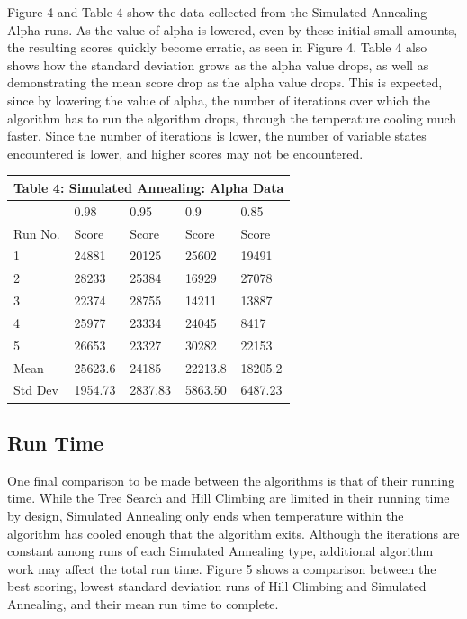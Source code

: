 \documentclass[10pt, twocolumn]{article}
\begin{document}
Figure 4 and Table 4 show the data collected from the Simulated Annealing Alpha runs. As the
value of alpha is lowered, even by these initial small amounts, the resulting scores
quickly become erratic, as seen in Figure 4. Table 4 also shows how the standard deviation
grows as the alpha value drops, as well as demonstrating the mean score drop as the alpha value drops.
This is expected, since by lowering the value of alpha, the number of iterations over which the algorithm
has to run the algorithm drops, through the temperature cooling much faster. Since the number of
iterations is lower, the number of variable states encountered is lower, and higher scores may not be
encountered.

\bigbreak
\begin{tabular}{ |p{1.3cm}||p{1.2cm}|p{1.2cm}|p{1.2cm}|p{1.2cm}|  }
 \hline
 \multicolumn{5}{|c|}{Table 4: Simulated Annealing: Alpha Data} \\
 \hline
     & 0.98 & 0.95 & 0.9 & 0.85\\
 \hline
  Run No. & Score & Score & Score & Score\\
 \hline
   1 & 24881 &	20125	& 25602	& 19491\\
   2 & 28233 &	25384	& 16929	& 27078\\
   3 & 22374 &	28755 &	14211	& 13887\\
   4 & 25977 &	23334	& 24045	& 8417\\
   5 & 26653 &	23327	& 30282	& 22153\\
 \hline
 Mean & 25623.6	& 24185	& 22213.8	& 18205.2\\
 \hline
 Std Dev& 1954.73&	2837.83&	5863.50&	6487.23\\
 \hline
\end{tabular}
\bigbreak

\subsection{Run Time}
One final comparison to be made between the algorithms is that of their running time. While
the Tree Search and Hill Climbing are limited in their running time by design, Simulated
Annealing only ends when temperature within the algorithm has cooled enough that the algorithm
exits. Although the iterations are constant among runs of each Simulated Annealing type, additional
algorithm work may affect the total run time. Figure 5 shows a comparison between the best scoring, lowest
standard deviation runs of Hill Climbing and Simulated Annealing, and their mean run time to
complete.
\end{document}
